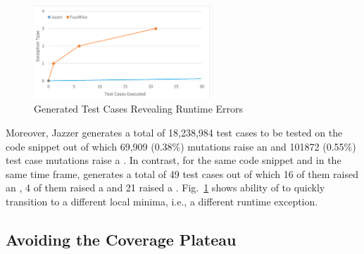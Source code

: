 \begin{figure}
\begin{center}
\includegraphics[width=2.6in]{RQ2_exception trend}
\vspace{-9pt}
\caption{Generated Test Cases Revealing Runtime Errors}
\label{fig:rq2}
\end{center}
\end{figure}

Moreover,  Jazzer generates a total of 18,238,984 test cases to be tested on the code snippet out of which 69,909 (0.38\%) mutations raise an  and 101872 (0.55\%) test case mutations raise a . In contrast, for the same code snippet and in the same time frame, {\tool} generates a total of 49 test cases out of which 16 of them raised an ,  4 of them raised a  and 21 raised a .
%
Fig.~\ref{fig:rq2} shows ability of {\tool} to quickly
transition to a different local minima, i.e., a different runtime
exception.


\subsection*{Avoiding the Coverage Plateau}
\label{sec:rq3}


